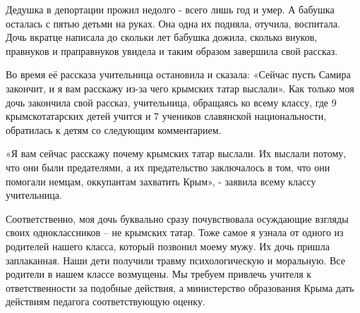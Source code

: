 Дедушка в депортации прожил недолго - всего лишь год и умер. А бабушка осталась
с пятью детьми на руках. Она одна их подняла, отучила, воспитала. Дочь вкратце
написала до скольки лет бабушка дожила, сколько внуков, правнуков и
праправнуков увидела и таким образом завершила свой рассказ. 

Во время её рассказа учительница остановила и сказала: «Сейчас пусть Самира
закончит, и я вам расскажу из-за чего крымских татар выслали». Как только моя
дочь закончила свой рассказ, учительница, обращаясь ко всему классу, где 9
крымскотатарских детей учится и 7 учеников славянской национальности,
обратилась к детям со следующим комментарием.

«Я вам сейчас расскажу почему крымских татар выслали. Их выслали потому, что
они были предателями, а их предательство заключалось в том, что они помогали
немцам, оккупантам захватить Крым», - заявила всему классу учительница.

Соответственно, моя дочь буквально сразу почувствовала осуждающие взгляды своих
одноклассников – не крымских татар. Тоже самое я узнала от одного из родителей
нашего класса, который позвонил моему мужу. Их дочь пришла заплаканная. Наши
дети получили травму психологическую и моральную. Все родители в нашем классе
возмущены. Мы требуем привлечь учителя к ответственности за подобные действия,
а министерство образования Крыма дать действиям педагога соответствующую
оценку.

